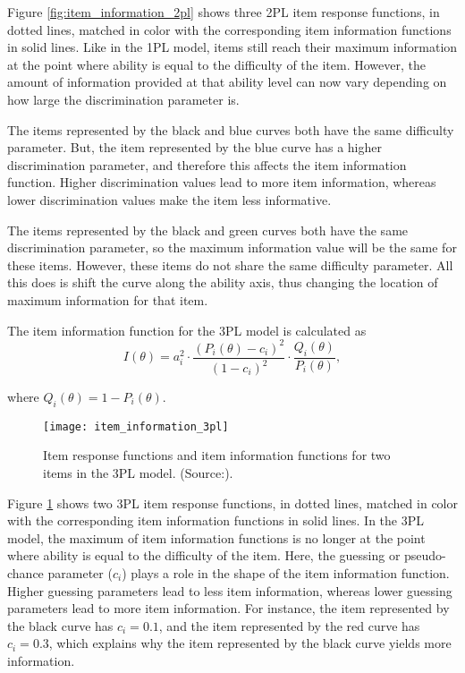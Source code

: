 Figure \ref{fig:item_information_2pl} shows three 2PL item response functions, in dotted lines, matched in color with the corresponding item information functions in solid lines. Like in the 1PL model, items still reach their maximum information at the point where ability is equal to the difficulty of the item. However, the amount of information provided at that ability level can now vary depending on how large the discrimination parameter is.\newline

The items represented by the black and blue curves both have the same difficulty parameter. But, the item represented by the blue curve has a higher discrimination parameter, and therefore this affects the item information function. Higher discrimination values lead to more item information, whereas lower discrimination values make the item less informative. \newline

The items represented by the black and green curves both have the same discrimination parameter, so the maximum information value will be the same for these items. However, these items do not share the same difficulty parameter. All this does is shift the curve along the ability axis, thus changing the location of maximum information for that item.\newline

The item information function for the 3PL model is calculated as
$$I(\theta) = a_i^2 \cdot \dfrac{(P_i(\theta)-c_i)^2}{(1-c_i)^2} \cdot \dfrac{Q_i(\theta)}{P_i(\theta)},$$

where $Q_i(\theta) = 1-P_i(\theta)$.

\begin{figure}[H]
\centering
\texttt{[image: item\_information\_3pl]}
\caption{Item response functions and item information
functions for two items in the 3PL model. (Source:\cite{Visual-IRT}).}
\label{fig:item_information_3pl}
\end{figure}

Figure \ref{fig:item_information_3pl} shows two 3PL item response functions, in dotted lines, matched in color with the corresponding item information functions in solid lines. In the 3PL model, the maximum of item information functions is no longer at the point where ability is equal to the difficulty of the item. Here, the guessing or pseudo-chance parameter ($c_i$) plays a role in the shape of the item information function. Higher guessing parameters lead to less item information, whereas lower guessing parameters lead to more item information. For instance, the item represented by the black curve has $c_i=0.1$, and the item represented by the red curve has $c_i=0.3$, which explains why the item represented by the black curve yields more information.

